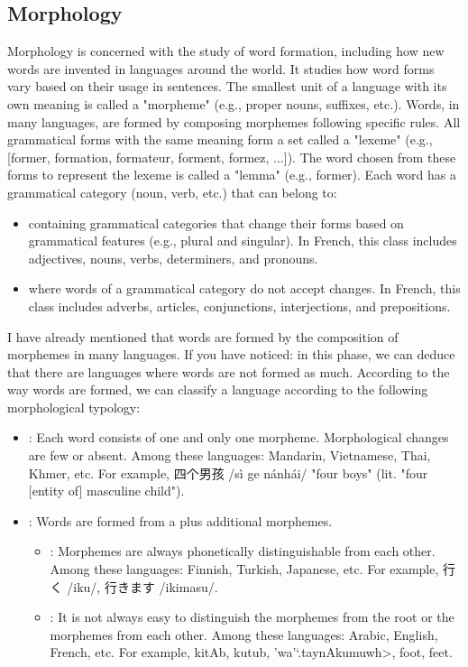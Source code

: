 \documentclass{KBook}
\begin{document}
\subsection{Morphology}

Morphology is concerned with the study of word formation, including how new words are invented in languages around the world. It studies how word forms vary based on their usage in sentences. The smallest unit of a language with its own meaning is called a "morpheme" (e.g., proper nouns, suffixes, etc.). Words, in many languages, are formed by composing morphemes following specific rules. All grammatical forms with the same meaning form a set called a "lexeme" (e.g., [former, formation, formateur, forment, formez, ...]). The word chosen from these forms to represent the lexeme is called a "lemma" (e.g., former). Each word has a grammatical category (noun, verb, etc.) that can belong to:
\begin{itemize}
	\item {} containing grammatical categories that change their forms based on grammatical features (e.g., plural and singular). In French, this class includes adjectives, nouns, verbs, determiners, and pronouns.
	\item {} where words of a grammatical category do not accept changes. In French, this class includes adverbs, articles, conjunctions, interjections, and prepositions.
\end{itemize}

I have already mentioned that words are formed by the composition of morphemes in many languages. If you have noticed: in this phase, we can deduce that there are languages where words are not formed as much. According to the way words are formed, we can classify a language according to the following morphological typology:
\begin{itemize}
	\item {}: Each word consists of one and only one morpheme. Morphological changes are few or absent. Among these languages: Mandarin, Vietnamese, Thai, Khmer, etc. For example, 四个男孩 /sì ge nánhái/ "four boys" (lit. "four [entity of] masculine child").
	
	\item {}: Words are formed from a  plus additional morphemes.
	\begin{itemize}
		\item {}: Morphemes are always phonetically distinguishable from each other. Among these languages: Finnish, Turkish, Japanese, etc. For example, 行く /iku/, 行きます /ikimasu/.
		
		\item {}: It is not always easy to distinguish the morphemes from the root or the morphemes from each other. Among these languages: Arabic, English, French, etc. For example, \<kitAb, kutub, 'wa'`.taynAkumuwh>, foot, feet.
	\end{itemize}
\end{itemize}
\end{document}
